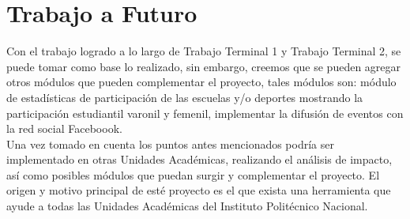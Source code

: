 \chapter*{Trabajo a Futuro}
{}
	Con el trabajo logrado a lo largo de Trabajo Terminal 1 y Trabajo Terminal 2, se puede tomar como base lo realizado, sin embargo, creemos que se pueden agregar otros módulos que pueden complementar el proyecto, tales módulos son: módulo de
	estadísticas de participación de las escuelas y/o deportes mostrando la participación estudiantil varonil y femenil, implementar la difusión de eventos con la red social
	Faceboook.\\
	
	Una vez tomado en cuenta los puntos antes mencionados podría ser implementado en otras Unidades Académicas, realizando el análisis de impacto, así como posibles módulos que puedan surgir y complementar el proyecto. El origen y motivo principal de esté
	proyecto es el que exista una herramienta que ayude a todas las Unidades Académicas del Instituto Politécnico Nacional.\\
	